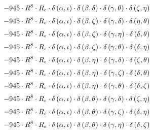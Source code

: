 \begin{subequations}
\begin{gather}
 \\[0.2em] \notag 		 - 945 \cdot R^{8} \cdot R_{\epsilon{}} \cdot \delta{}\left(\alpha{}, \iota{}\right) \cdot \delta{}\left(\beta{}, \delta{}\right) \cdot \delta{}\left(\gamma{}, \theta{}\right) \cdot \delta{}\left(\zeta{}, \eta{}\right) 
 \\[0.2em] \notag 		 - 945 \cdot R^{8} \cdot R_{\epsilon{}} \cdot \delta{}\left(\alpha{}, \iota{}\right) \cdot \delta{}\left(\beta{}, \zeta{}\right) \cdot \delta{}\left(\gamma{}, \delta{}\right) \cdot \delta{}\left(\eta{}, \theta{}\right) 
 \\[0.2em] \notag 		 - 945 \cdot R^{8} \cdot R_{\epsilon{}} \cdot \delta{}\left(\alpha{}, \iota{}\right) \cdot \delta{}\left(\beta{}, \zeta{}\right) \cdot \delta{}\left(\gamma{}, \eta{}\right) \cdot \delta{}\left(\delta{}, \theta{}\right) 
 \\[0.2em] \notag 		 - 945 \cdot R^{8} \cdot R_{\epsilon{}} \cdot \delta{}\left(\alpha{}, \iota{}\right) \cdot \delta{}\left(\beta{}, \zeta{}\right) \cdot \delta{}\left(\gamma{}, \theta{}\right) \cdot \delta{}\left(\delta{}, \eta{}\right) 
 \\[0.2em] \notag 		 - 945 \cdot R^{8} \cdot R_{\epsilon{}} \cdot \delta{}\left(\alpha{}, \iota{}\right) \cdot \delta{}\left(\beta{}, \eta{}\right) \cdot \delta{}\left(\gamma{}, \delta{}\right) \cdot \delta{}\left(\zeta{}, \theta{}\right) 
 \\[0.2em] \notag 		 - 945 \cdot R^{8} \cdot R_{\epsilon{}} \cdot \delta{}\left(\alpha{}, \iota{}\right) \cdot \delta{}\left(\beta{}, \eta{}\right) \cdot \delta{}\left(\gamma{}, \zeta{}\right) \cdot \delta{}\left(\delta{}, \theta{}\right) 
 \\[0.2em] \notag 		 - 945 \cdot R^{8} \cdot R_{\epsilon{}} \cdot \delta{}\left(\alpha{}, \iota{}\right) \cdot \delta{}\left(\beta{}, \eta{}\right) \cdot \delta{}\left(\gamma{}, \theta{}\right) \cdot \delta{}\left(\delta{}, \zeta{}\right) 
 \\[0.2em] \notag 		 - 945 \cdot R^{8} \cdot R_{\epsilon{}} \cdot \delta{}\left(\alpha{}, \iota{}\right) \cdot \delta{}\left(\beta{}, \theta{}\right) \cdot \delta{}\left(\gamma{}, \delta{}\right) \cdot \delta{}\left(\zeta{}, \eta{}\right) 
 \\[0.2em] \notag 		 - 945 \cdot R^{8} \cdot R_{\epsilon{}} \cdot \delta{}\left(\alpha{}, \iota{}\right) \cdot \delta{}\left(\beta{}, \theta{}\right) \cdot \delta{}\left(\gamma{}, \zeta{}\right) \cdot \delta{}\left(\delta{}, \eta{}\right) 
 \\[0.2em] \notag 		 - 945 \cdot R^{8} \cdot R_{\epsilon{}} \cdot \delta{}\left(\alpha{}, \iota{}\right) \cdot \delta{}\left(\beta{}, \theta{}\right) \cdot \delta{}\left(\gamma{}, \eta{}\right) \cdot \delta{}\left(\delta{}, \zeta{}\right) 

\end{gather}
\end{subequations}
